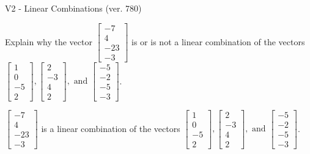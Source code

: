 \begin{exercise}
  \begin{exerciseTitle}V2 - Linear Combinations (ver. 780)\end{exerciseTitle}
  \begin{exerciseStatement}
    Explain why the vector \(\left[\begin{array}{c}
-7 \\
4 \\
-23 \\
-3
\end{array}\right]\)  is or is not a linear 
	combination of the vectors \(\left[\begin{array}{c}
1 \\
0 \\
-5 \\
2
\end{array}\right] , \left[\begin{array}{c}
2 \\
-3 \\
4 \\
2
\end{array}\right] , \text{ and } \left[\begin{array}{c}
-5 \\
-2 \\
-5 \\
-3
\end{array}\right]\).
	


  \end{exerciseStatement}
  \begin{exerciseAnswer}
   \(\left[\begin{array}{c}
-7 \\
4 \\
-23 \\
-3
\end{array}\right]\) 
  	 is  
	a linear combination of the vectors \(\left[\begin{array}{c}
1 \\
0 \\
-5 \\
2
\end{array}\right] , \left[\begin{array}{c}
2 \\
-3 \\
4 \\
2
\end{array}\right] , \text{ and } \left[\begin{array}{c}
-5 \\
-2 \\
-5 \\
-3
\end{array}\right]\).

	
  


  \end{exerciseAnswer}
\end{exercise}